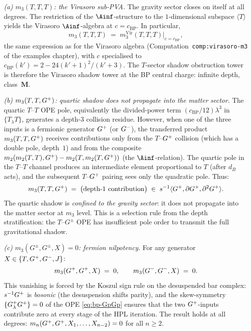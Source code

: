\begin{computation}[The ordered bar complex of the
Bershadsky--Polyakov algebra
$\mathcal{B}^{k'} = W_{k'}(\mathfrak{sl}_3,f_{\min})$;
\ClaimStatusProvedHere]
\emph{(a) $m_3(T,T,T)$: the Virasoro sub-PVA.}
The gravity sector closes on itself at all degrees. The
restriction of the $\Ainf$-structure to the
$1$-dimensional subspace $\langle T\rangle$ yields the
Virasoro $\Ainf$-algebra at $c=c_{\mathrm{BP}}$.
In particular,
\begin{equation}\label{eq:bp-m3-TTT}
m_3(T,T,T)
\;=\;
m_3^{\mathrm{Vir}}(T,T,T)\big|_{c=c_{\mathrm{BP}}},
\end{equation}
the same expression as for the Virasoro algebra
(Computation~\texttt{comp:virasoro-m3} of the examples chapter),
with $c$ specialised to
$c_{\mathrm{BP}}(k')=2-24(k'+1)^2/(k'+3)$.
The $T$-sector shadow obstruction tower is therefore the Virasoro shadow
tower at the BP central charge: infinite depth,
class~$\mathbf{M}$.

\emph{(b) $m_3(T,T,G^+)$: quartic shadow does not propagate
into the matter sector.}
The quartic $T$--$T$ OPE pole, equivalently the divided-power
term $(c_{\mathrm{BP}}/12)\lambda^3$ in $\{T_\lambda T\}$,
generates a depth-$3$ collision residue.
However, when one of the three inputs is a fermionic
generator $G^+$ (or $G^-$), the transferred product
$m_3(T,T,G^+)$ receives contributions only from the
$T$--$G^+$ collision (which has a double pole,
depth~$1$) and from the composite
$m_2(m_2(T,T),G^+) - m_2(T,m_2(T,G^+))$ (the
$\Ainf$-relation). The quartic pole in the $T$--$T$
channel produces an intermediate element proportional to
$T$ (after $d_B$ acts), and the subsequent
$T$--$G^+$ pairing sees only the quadratic pole. Thus:
\begin{equation}\label{eq:bp-m3-TTGp}
m_3(T,T,G^+)
\;=\;
\bigl(\text{depth-$1$ contribution}\bigr)
\;\in\;
s^{-1}\langle G^+,\partial G^+,\partial^2G^+\rangle.
\end{equation}
The quartic shadow is \emph{confined to the gravity sector}:
it does not propagate into the matter sector at $m_3$ level.
This is a selection rule from the depth stratification:
the $T$--$G^\pm$ OPE has insufficient pole order to transmit
the full gravitational shadow.

\emph{(c) $m_3(G^\pm,G^\pm,X)=0$: fermion nilpotency.}
For any generator $X\in\{T,G^+,G^-,J\}$:
\begin{equation}\label{eq:bp-m3-fermion-nil}
m_3(G^+,G^+,X) \;=\; 0,
\qquad
m_3(G^-,G^-,X) \;=\; 0.
\end{equation}
This vanishing is forced by the Koszul sign rule on the
desuspended bar complex: $s^{-1}G^+$ is \emph{bosonic}
(the desuspension shifts parity), and the skew-symmetry
$\{G^+_\lambda G^+\}=0$ of the OPE
\eqref{eq:bp-GpGp} ensures that the two $G^+$-inputs
contribute zero at every stage of the HPL iteration.
The result holds at all degrees:
$m_n(G^+,G^+,X_1,\dots,X_{n-2})=0$ for all $n\ge 2$.


\end{computation}
